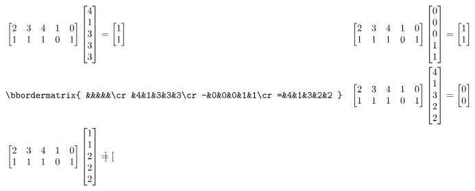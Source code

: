 \begin{enumerate}[label=\alph*)]
\begin{align*}
&\begin{bmatrix}
2& 3& 4& 1& 0\\
1& 1& 1& 0& 1 
\end{bmatrix}\begin{bmatrix}
4\\ 1\\ 3\\ 3\\ 3
\end{bmatrix}=\begin{bmatrix}
1\\1
\end{bmatrix}& \begin{bmatrix}
2& 3& 4& 1& 0\\
1& 1& 1& 0& 1 
\end{bmatrix}\begin{bmatrix}
0\\ 0\\ 0\\ 1\\ 1
\end{bmatrix}=\begin{bmatrix}
1\\1
\end{bmatrix}\\
&\bbordermatrix{
&&&&&\cr
&4&1&3&3&3\cr
-&0&0&0&1&1\cr
=&4&1&3&2&2
}&\begin{bmatrix}
2& 3& 4& 1& 0\\
1& 1& 1& 0& 1 
\end{bmatrix}\begin{bmatrix}
4\\ 1\\ 3\\ 2\\ 2
\end{bmatrix}=\begin{bmatrix}
0\\0
\end{bmatrix}\\
&\begin{bmatrix}
2& 3& 4& 1& 0\\
1& 1& 1& 0& 1 
\end{bmatrix}\begin{bmatrix}
1\\ 1\\ 2\\ 2\\ 2
\end{bmatrix}=\begin{bmatrix}

\end{bmatrix}
\end{align*}
\end{enumerate}
